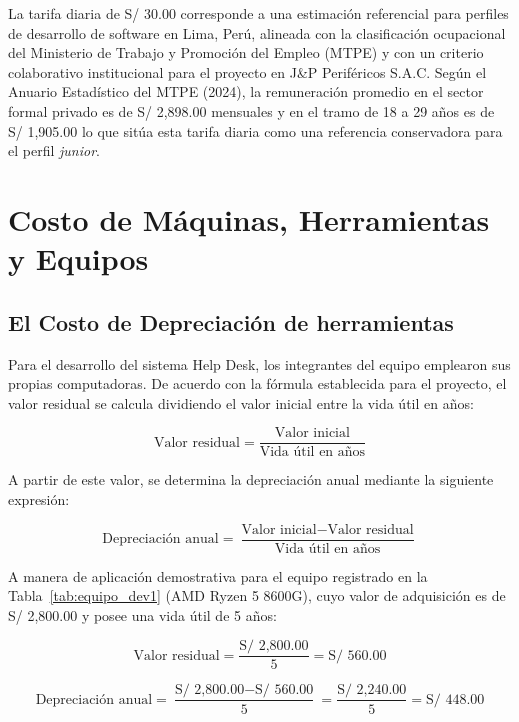 \indent La tarifa diaria de S/ 30.00 corresponde a una estimación referencial para perfiles de desarrollo de software en Lima, Perú, alineada con la clasificación ocupacional del Ministerio de Trabajo y Promoción del Empleo (MTPE) y con un criterio colaborativo institucional para el proyecto en J\&P Periféricos S.A.C. Según el Anuario Estadístico del MTPE (2024), la remuneración promedio en el sector formal privado es de S/ 2,898.00 mensuales y en el tramo de 18 a 29 años es de S/ 1,905.00 lo que sitúa esta tarifa diaria como una referencia conservadora para el perfil \textit{junior}.

\par

\section{Costo de Máquinas, Herramientas y Equipos}

\subsection{El Costo de Depreciación de herramientas}

Para el desarrollo del sistema Help Desk, los integrantes del equipo emplearon sus propias computadoras. De acuerdo con la fórmula establecida para el proyecto, el valor residual se calcula dividiendo el valor inicial entre la vida útil en años:

\begin{equation}
\text{Valor residual} = \frac{\text{Valor inicial}}{\text{Vida útil en años}}
\end{equation}

A partir de este valor, se determina la depreciación anual mediante la siguiente expresión:

\begin{equation}
\text{Depreciación anual} = \frac{\text{Valor inicial} - \text{Valor residual}}{\text{Vida útil en años}}
\end{equation}

A manera de aplicación demostrativa para el equipo registrado en la Tabla~\ref{tab:equipo_dev1} (AMD Ryzen 5 8600G), cuyo valor de adquisición es de S/ 2,800.00 y posee una vida útil de 5 años:

\[
\text{Valor residual} = \frac{\text{S/ 2,800.00}}{5} = \text{S/ 560.00}
\]

\[
\text{Depreciación anual} = \frac{\text{S/ 2,800.00} - \text{S/ 560.00}}{5} = \frac{\text{S/ 2,240.00}}{5} = \text{S/ 448.00}
\]


